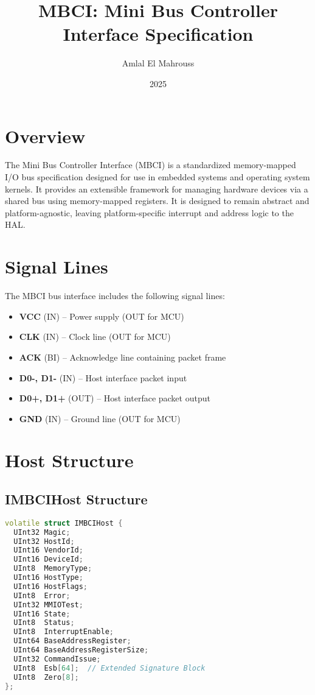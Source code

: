 \documentclass{article}
\title{MBCI: Mini Bus Controller Interface Specification}
\author{Amlal El Mahrouss}
\date{2025}
\begin{document}
\maketitle

\section{Overview}
The Mini Bus Controller Interface (MBCI) is a standardized memory-mapped I/O bus specification designed for use in embedded systems and operating system kernels. It provides an extensible framework for managing hardware devices via a shared bus using memory-mapped registers. It is designed to remain abstract and platform-agnostic, leaving platform-specific interrupt and address logic to the HAL.

\section{Signal Lines}
The MBCI bus interface includes the following signal lines:

\begin{itemize}
  \item \textbf{VCC} (IN) – Power supply (OUT for MCU)
  \item \textbf{CLK} (IN) – Clock line (OUT for MCU)
  \item \textbf{ACK} (BI) – Acknowledge line containing packet frame
  \item \textbf{D0-, D1-} (IN) – Host interface packet input
  \item \textbf{D0+, D1+} (OUT) – Host interface packet output
  \item \textbf{GND} (IN) – Ground line (OUT for MCU)
\end{itemize}

\section{Host Structure}

\subsection*{IMBCIHost Structure}

\begin{lstlisting}[language=C++,basicstyle=\ttfamily\footnotesize]
volatile struct IMBCIHost {
  UInt32 Magic;
  UInt32 HostId;
  UInt16 VendorId;
  UInt16 DeviceId;
  UInt8  MemoryType;
  UInt16 HostType;
  UInt16 HostFlags;
  UInt8  Error;
  UInt32 MMIOTest;
  UInt16 State;
  UInt8  Status;
  UInt8  InterruptEnable;
  UInt64 BaseAddressRegister;
  UInt64 BaseAddressRegisterSize;
  UInt32 CommandIssue;
  UInt8  Esb[64];  // Extended Signature Block
  UInt8  Zero[8];
};
\end{lstlisting}
\end{document}
